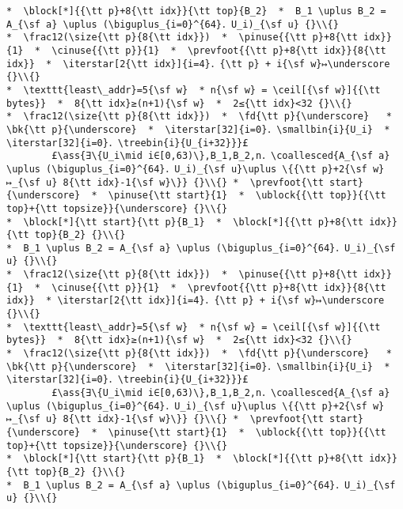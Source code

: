 \documentclass[10pt,a4paper,twoside]{report}
\makeatletter
\newcommand{\ml}[2][t]{\mbox{\mdseries\begin{tabular}[#1]{@{}L@{}}#2\end{tabular}}}
\newcommand{\ass}[1]{\ensuremath{{\color{blue}\left\{\ml[c]{#1}\right\}}}}
\renewcommand{\ceil}[2][]{\left\lceil{#2}\right\rceil_{#1}}
\newcommand{\iterstar}[2][]{\text{\LARGE $*$}^{#1}_{#2}}
\makeatother
\begin{document}
\begin{lstlisting}
*  \block[*]{{\tt p}+8{\tt idx}}{\tt top}{B_2}  *  B_1 \uplus B_2 = A_{\sf a} \uplus (\biguplus_{i=0}^{64}．U_i)_{\sf u} {}\\{}
*  \frac12(\size{\tt p}{8{\tt idx}})  *  \pinuse{{\tt p}+8{\tt idx}}{1}  *  \cinuse{{\tt p}}{1}  *  \prevfoot{{\tt p}+8{\tt idx}}{8{\tt idx}}  *  \iterstar[2{\tt idx}]{i=4}．{\tt p} + i{\sf w}↦\underscore {}\\{}
*  \texttt{least\_addr}=5{\sf w}  * n{\sf w} = \ceil[{\sf w}]{{\tt bytes}}  *  8{\tt idx}≥(n+1){\sf w}  *  2≤{\tt idx}<32 {}\\{}
*  \frac12(\size{\tt p}{8{\tt idx}})  *  \fd{\tt p}{\underscore}   *  \bk{\tt p}{\underscore}  *  \iterstar[32]{i=0}．\smallbin{i}{U_i}  *  \iterstar[32]{i=0}．\treebin{i}{U_{i+32}}}£ 
        £\ass{∃\{U_i\mid i∈[0,63)\},B_1,B_2,n．\coallesced{A_{\sf a} \uplus (\biguplus_{i=0}^{64}．U_i)_{\sf u}\uplus \{{\tt p}+2{\sf w}↦_{\sf u} 8{\tt idx}-1{\sf w}\}} {}\\{} *  \prevfoot{\tt start}{\underscore}  *  \pinuse{\tt start}{1}  *  \ublock{{\tt top}}{{\tt top}+{\tt topsize}}{\underscore} {}\\{}
*  \block[*]{\tt start}{\tt p}{B_1}  *  \block[*]{{\tt p}+8{\tt idx}}{\tt top}{B_2} {}\\{}
*  B_1 \uplus B_2 = A_{\sf a} \uplus (\biguplus_{i=0}^{64}．U_i)_{\sf u} {}\\{}
*  \frac12(\size{\tt p}{8{\tt idx}})  *  \pinuse{{\tt p}+8{\tt idx}}{1}  *  \cinuse{{\tt p}}{1}  *  \prevfoot{{\tt p}+8{\tt idx}}{8{\tt idx}}  * \iterstar[2{\tt idx}]{i=4}．{\tt p} + i{\sf w}↦\underscore {}\\{}
*  \texttt{least\_addr}=5{\sf w}  * n{\sf w} = \ceil[{\sf w}]{{\tt bytes}}  *  8{\tt idx}≥(n+1){\sf w}  *  2≤{\tt idx}<32 {}\\{}
*  \frac12(\size{\tt p}{8{\tt idx}})  *  \fd{\tt p}{\underscore}   *  \bk{\tt p}{\underscore}  *  \iterstar[32]{i=0}．\smallbin{i}{U_i}  *  \iterstar[32]{i=0}．\treebin{i}{U_{i+32}}}£ 
        £\ass{∃\{U_i\mid i∈[0,63)\},B_1,B_2,n．\coallesced{A_{\sf a} \uplus (\biguplus_{i=0}^{64}．U_i)_{\sf u}\uplus \{{\tt p}+2{\sf w}↦_{\sf u} 8{\tt idx}-1{\sf w}\}} {}\\{} *  \prevfoot{\tt start}{\underscore}  *  \pinuse{\tt start}{1}  *  \ublock{{\tt top}}{{\tt top}+{\tt topsize}}{\underscore} {}\\{}
*  \block[*]{\tt start}{\tt p}{B_1}  *  \block[*]{{\tt p}+8{\tt idx}}{\tt top}{B_2} {}\\{}
*  B_1 \uplus B_2 = A_{\sf a} \uplus (\biguplus_{i=0}^{64}．U_i)_{\sf u} {}\\{}

\end{lstlisting}
\end{document}
